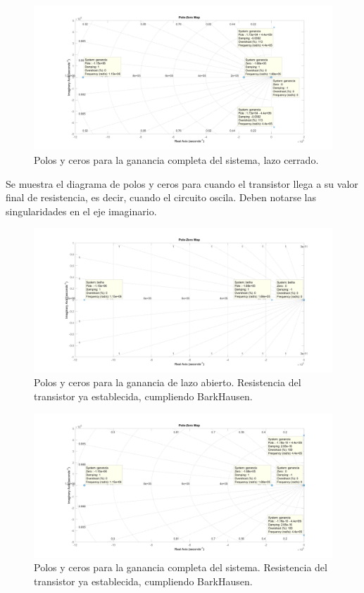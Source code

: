 \documentclass[../../tc_tp6_main.tex]{subfiles}
\begin{document}
\begin{figure}[H]	
	\centering
	\includegraphics[scale=0.2]{imagenes/polos_ceros_T.png}
	\caption{Polos y ceros para la ganancia completa del sistema, lazo cerrado.}
	\label{fig:ej1_polos_ceros_T}
\end{figure}

Se muestra el diagrama de polos y ceros para cuando el transistor llega a su valor final de resistencia, es decir, cuando el circuito oscila. Deben notarse las singularidades en el eje imaginario.

\begin{figure}[H]	
	\centering
	\includegraphics[scale=0.2]{imagenes/polos_ceros_betha_rfinal.png}
	\caption{Polos y ceros para la ganancia de lazo abierto. Resistencia del transistor ya establecida, cumpliendo BarkHausen.}
	\label{fig:ej1_polos_ceros_ganancia_rfinal}
\end{figure}

\begin{figure}[H]	
	\centering
	\includegraphics[scale=0.2]{imagenes/polos_ceros_ganancia_rfinal.png}
	\caption{Polos y ceros para la ganancia completa del sistema. Resistencia del transistor ya establecida, cumpliendo BarkHausen.}
	\label{fig:ej1_polos_ceros_ganancia_rfinal}
\end{figure}
\end{document}
